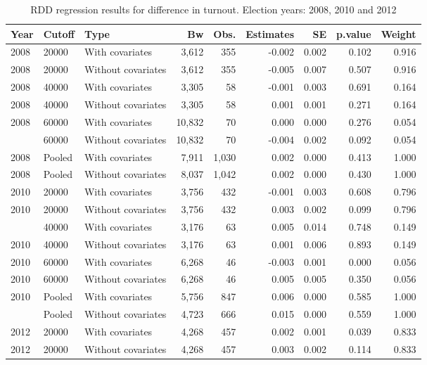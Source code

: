 \documentclass[12pt,]{article}
\begin{document}
\begin{table}[!h]

\caption{\label{tab:reg.part.dif}RDD regression results for difference in turnout. Election years: 2008, 2010 and 2012}
\centering
\begin{tabular}{lllrrrrrr}
\toprule
Year & Cutoff & Type & Bw & Obs. & Estimates & SE & p.value & Weight\\
\midrule
2008 & 20000 & With covariates & 3,612 & 355 & -0.002 & 0.002 & 0.102 & 0.916\\
2008 & 20000 & Without covariates & 3,612 & 355 & -0.005 & 0.007 & 0.507 & 0.916\\
2008 & 40000 & With covariates & 3,305 & 58 & -0.001 & 0.003 & 0.691 & 0.164\\
2008 & 40000 & Without covariates & 3,305 & 58 & 0.001 & 0.001 & 0.271 & 0.164\\
2008 & 60000 & With covariates & 10,832 & 70 & 0.000 & 0.000 & 0.276 & 0.054\\
\addlinespace
2008 & 60000 & Without covariates & 10,832 & 70 & -0.004 & 0.002 & 0.092 & 0.054\\
2008 & Pooled & With covariates & 7,911 & 1,030 & 0.002 & 0.000 & 0.413 & 1.000\\
2008 & Pooled & Without covariates & 8,037 & 1,042 & 0.002 & 0.000 & 0.430 & 1.000\\
2010 & 20000 & With covariates & 3,756 & 432 & -0.001 & 0.003 & 0.608 & 0.796\\
2010 & 20000 & Without covariates & 3,756 & 432 & 0.003 & 0.002 & 0.099 & 0.796\\
\addlinespace
2010 & 40000 & With covariates & 3,176 & 63 & 0.005 & 0.014 & 0.748 & 0.149\\
2010 & 40000 & Without covariates & 3,176 & 63 & 0.001 & 0.006 & 0.893 & 0.149\\
2010 & 60000 & With covariates & 6,268 & 46 & -0.003 & 0.001 & 0.000 & 0.056\\
2010 & 60000 & Without covariates & 6,268 & 46 & 0.005 & 0.005 & 0.350 & 0.056\\
2010 & Pooled & With covariates & 5,756 & 847 & 0.006 & 0.000 & 0.585 & 1.000\\
\addlinespace
2010 & Pooled & Without covariates & 4,723 & 666 & 0.015 & 0.000 & 0.559 & 1.000\\
2012 & 20000 & With covariates & 4,268 & 457 & 0.002 & 0.001 & 0.039 & 0.833\\
2012 & 20000 & Without covariates & 4,268 & 457 & 0.003 & 0.002 & 0.114 & 0.833\\

\end{tabular}
\end{table}
\end{document}
